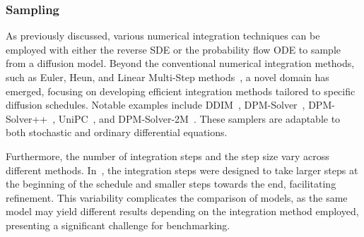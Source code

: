 \subsubsection{Sampling}

As previously discussed, various numerical integration techniques can be employed with either the reverse SDE or the probability flow ODE to sample from a diffusion model.
Beyond the conventional numerical integration methods, such as Euler, Heun, and Linear Multi-Step methods~\cite{heun}, a novel domain has emerged, focusing on developing efficient integration methods tailored to specific diffusion schedules.
Notable examples include DDIM~\cite{DDIM}, DPM-Solver~\cite{DPMSolverFastODE}, DPM-Solver++~\cite{DPMSolverFastSolver}, UniPC~\cite{UniPC}, and DPM-Solver-2M~\cite{DPMSolverFastSolver}.
These samplers are adaptable to both stochastic and ordinary differential equations.

Furthermore, the number of integration steps and the step size vary across different methods. In~\cite{ElucidatingDesignSpace}, the integration steps were designed to take larger steps at the beginning of the schedule and smaller steps towards the end, facilitating refinement. This variability complicates the comparison of models, as the same model may yield different results depending on the integration method employed, presenting a significant challenge for benchmarking.

